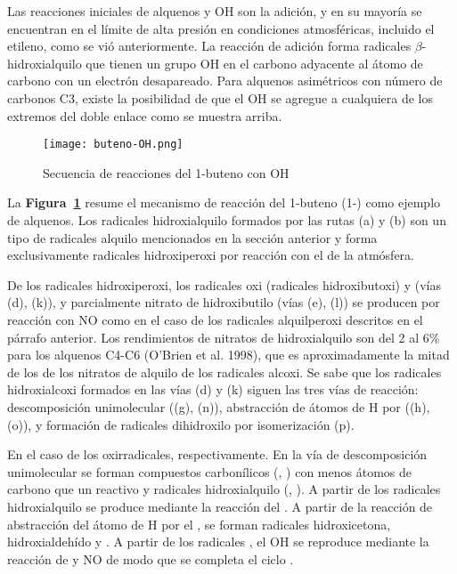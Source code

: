 {Las reacciones iniciales de alquenos y OH son la adición, y en su mayoría se encuentran en el límite de alta presión en condiciones atmosféricas, incluido el etileno, como se vió anteriormente. La reacción de adición forma radicales $\beta$-hidroxialquilo que tienen un grupo OH en el carbono adyacente al átomo de carbono con un electrón desapareado.
Para alquenos asimétricos con número de carbonos C3, existe la posibilidad de que el OH se agregue a cualquiera de los extremos del doble enlace como se muestra arriba.

\begin{figure}[htbp]
\begin{center}
\texttt{[image: buteno-OH.png]}
\caption{Secuencia de reacciones del 1-buteno con OH}
\label{butenOH}
\end{center}
\end{figure}

La \textbf{Figura~\ref{butenOH}} resume el mecanismo de reacción del 1-buteno (1-) como ejemplo de alquenos. Los radicales hidroxialquilo formados por las rutas (a) y (b) son un tipo de radicales alquilo mencionados en la sección anterior y forma exclusivamente radicales hidroxiperoxi por reacción con el  de la atmósfera.

De los radicales hidroxiperoxi, los radicales oxi (radicales hidroxibutoxi) y  (vías (d), (k)), y parcialmente nitrato de hidroxibutilo (vías (e), (l)) se producen por reacción con NO como en el caso de los radicales alquilperoxi descritos en el párrafo anterior. Los rendimientos de nitratos de hidroxialquilo son del 2 al 6\% para los alquenos C4-C6 (O'Brien et al. 1998), que es aproximadamente la mitad de los de los nitratos de alquilo de los radicales alcoxi. Se sabe que los radicales hidroxialcoxi formados en las vías (d) y (k) siguen las tres vías de reacción: descomposición unimolecular ((g), (n)), abstracción de átomos de H por  ((h), (o)), y formación de radicales dihidroxilo por isomerización (p).

En el caso de los oxirradicales, respectivamente. En la vía de descomposición unimolecular se forman compuestos carbonílicos (, ) con menos átomos de carbono que un reactivo y radicales hidroxialquilo (, ). A partir de los radicales hidroxialquilo se produce  mediante la reacción del . A partir de la reacción de abstracción del átomo de H por el , se forman radicales hidroxicetona, hidroxialdehído y . A partir de los radicales , el OH se reproduce mediante la reacción de  y NO de modo que se completa el ciclo .

}

